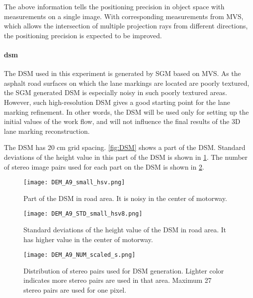 The above information tells the positioning precision in object space with measurements on a single image. With corresponding measurements from MVS, which allows the intersection of multiple projection rays from different directions, the positioning precision is expected to be improved.%



\paragraph{\gls{dsm}}
The DSM used in this experiment is generated by SGM based on MVS. As the asphalt road surfaces on which the lane markings are located are poorly textured, the SGM generated DSM is especially noisy in such poorly textured areas. However, such high-resolution DSM gives a good starting point for the lane marking refinement. In other words, the DSM will be used only for setting up the initial values of the work flow, and will not influence the final results of the 3D lane marking reconstruction.

The DSM has 20 cm grid spacing. \cref{fig:DSM} shows a part of the DSM. Standard deviations of the height value in this part of the DSM is shown in \cref{fig:DSMstd}. The number of stereo image pairs used for each part on the DSM is shown in \cref{fig:DSMnumber}.

\begin{figure}%
  \centering
  \texttt{[image: DEM\_A9\_small\_hsv.png]}
  \caption{\small Part of the DSM in road area. It is noisy in the center of motorway.}
  \label{fig:DSM}
  \vspace{0.5cm}
  \texttt{[image: DEM\_A9\_STD\_small\_hsv8.png]}
  \caption{\small Standard deviations of the height value of the DSM in road area. It has higher value in the center of motorway.}
  \label{fig:DSMstd}

\end{figure}

\begin{figure}%
  \centering
  \texttt{[image: DEM\_A9\_NUM\_scaled\_s.png]}
  \caption{\small Distribution of stereo pairs used for DSM generation. Lighter color indicates more stereo pairs are used in that area. Maximum 27 stereo pairs are used for one pixel.}%
  \label{fig:DSMnumber}
\end{figure}



